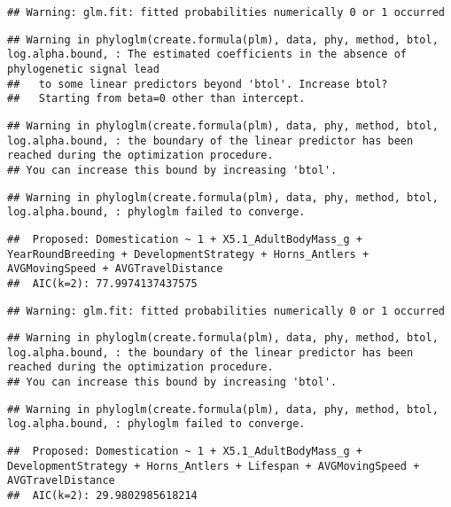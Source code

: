 \documentclass[
]{article}
\begin{document}
\begin{verbatim}
## Warning: glm.fit: fitted probabilities numerically 0 or 1 occurred
\end{verbatim}

\begin{verbatim}
## Warning in phyloglm(create.formula(plm), data, phy, method, btol, log.alpha.bound, : The estimated coefficients in the absence of phylogenetic signal lead
##   to some linear predictors beyond 'btol'. Increase btol?
##   Starting from beta=0 other than intercept.
\end{verbatim}

\begin{verbatim}
## Warning in phyloglm(create.formula(plm), data, phy, method, btol, log.alpha.bound, : the boundary of the linear predictor has been reached during the optimization procedure.
## You can increase this bound by increasing 'btol'.
\end{verbatim}

\begin{verbatim}
## Warning in phyloglm(create.formula(plm), data, phy, method, btol, log.alpha.bound, : phyloglm failed to converge.
\end{verbatim}

\begin{verbatim}
##  Proposed: Domestication ~ 1 + X5.1_AdultBodyMass_g + YearRoundBreeding + DevelopmentStrategy + Horns_Antlers + AVGMovingSpeed + AVGTravelDistance
##  AIC(k=2): 77.9974137437575
\end{verbatim}

\begin{verbatim}
## Warning: glm.fit: fitted probabilities numerically 0 or 1 occurred
\end{verbatim}

\begin{verbatim}
## Warning in phyloglm(create.formula(plm), data, phy, method, btol, log.alpha.bound, : the boundary of the linear predictor has been reached during the optimization procedure.
## You can increase this bound by increasing 'btol'.
\end{verbatim}

\begin{verbatim}
## Warning in phyloglm(create.formula(plm), data, phy, method, btol, log.alpha.bound, : phyloglm failed to converge.
\end{verbatim}

\begin{verbatim}
##  Proposed: Domestication ~ 1 + X5.1_AdultBodyMass_g + DevelopmentStrategy + Horns_Antlers + Lifespan + AVGMovingSpeed + AVGTravelDistance
##  AIC(k=2): 29.9802985618214
\end{verbatim}
\end{document}
